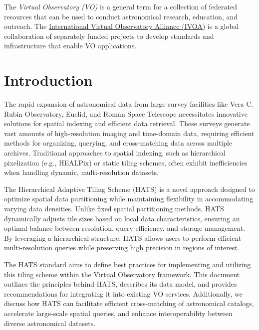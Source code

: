 \documentclass[11pt,a4paper]{ivoa}
\begin{document}
The \emph{Virtual Observatory (VO)} is a
general term for a collection of federated resources that can be used
to conduct astronomical research, education, and outreach.
The \href{https://www.ivoa.net}{International
Virtual Observatory Alliance (IVOA)} is a global
collaboration of separately funded projects to develop standards and
infrastructure that enable VO applications.

\section{Introduction}
    The rapid expansion of astronomical data from large survey facilities like Vera C. Rubin Observatory, Euclid, and Roman Space Telescope necessitates innovative solutions for spatial indexing and efficient data retrieval. These surveys generate vast amounts of high-resolution imaging and time-domain data, requiring efficient methods for organizing, querying, and cross-matching data across multiple archives. Traditional approaches to spatial indexing, such as hierarchical pixelization (e.g., HEALPix) or static tiling schemes, often exhibit inefficiencies when handling dynamic, multi-resolution datasets.

    The Hierarchical Adaptive Tiling Scheme (HATS) is a novel approach designed to optimize spatial data partitioning while maintaining flexibility in accommodating varying data densities. Unlike fixed spatial partitioning methods, HATS dynamically adjusts tile sizes based on local data characteristics, ensuring an optimal balance between resolution, query efficiency, and storage management. By leveraging a hierarchical structure, HATS allows users to perform efficient multi-resolution queries while preserving high precision in regions of interest.

    The HATS standard aims to define best practices for implementing and utilizing this tiling scheme within the Virtual Observatory framework. This document outlines the principles behind HATS, describes its data model, and provides recommendations for integrating it into existing VO services. Additionally, we discuss how HATS can facilitate efficient cross-matching of astronomical catalogs, accelerate large-scale spatial queries, and enhance interoperability between diverse astronomical datasets.
\end{document}
